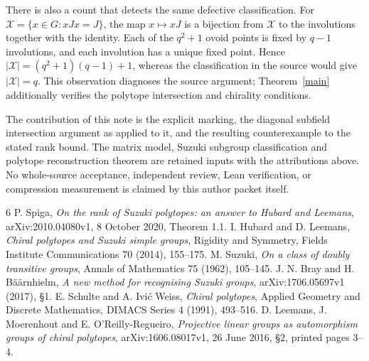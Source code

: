 \documentclass[11pt,a4paper]{article}
\begin{document}
There is also a count that detects the same defective classification.
For $\mathcal X=\{x\in G:xJx=J\}$, the map $x\mapsto xJ$ is a
bijection from $\mathcal X$ to the involutions together with the
identity. Each of the $q^2+1$ ovoid points is fixed by $q-1$
involutions, and each involution has a unique fixed point. Hence
$|\mathcal X|=(q^2+1)(q-1)+1$, whereas the classification in the source
would give $|\mathcal X|=q$. This observation diagnoses the source
argument; Theorem~\ref{main} additionally verifies the polytope
intersection and chirality conditions.

The contribution of this note is the explicit marking, the diagonal
subfield intersection argument as applied to it, and the resulting
counterexample to the stated rank bound. The matrix model, Suzuki
subgroup classification and polytope reconstruction theorem are
retained inputs with the attributions above. No whole-source
acceptance, independent review, Lean verification, or compression
measurement is claimed by this author packet itself.

\begin{thebibliography}{6}
 P. Spiga, \emph{On the rank of Suzuki polytopes:
an answer to Hubard and Leemans}, arXiv:2010.04080v1,
8 October 2020, Theorem 1.1.
 I. Hubard and D. Leemans, \emph{Chiral polytopes and
Suzuki simple groups}, Rigidity and Symmetry, Fields Institute
Communications 70 (2014), 155--175.
 M. Suzuki, \emph{On a class of doubly transitive
groups}, Annals of Mathematics 75 (1962), 105--145.
 J. N. Bray and H. B\"a\"arnhielm,
\emph{A new method for recognising Suzuki groups},
arXiv:1706.05697v1 (2017), \S1.
 E. Schulte and A. Ivi\'c Weiss, \emph{Chiral polytopes},
Applied Geometry and Discrete Mathematics, DIMACS Series 4 (1991),
493--516.
 D. Leemans, J. Moerenhout and E. O'Reilly-Regueiro,
\emph{Projective linear groups as automorphism groups of chiral
polytopes}, arXiv:1606.08017v1, 26 June 2016, \S2, printed pages 3--4.
\end{thebibliography}
\end{document}
